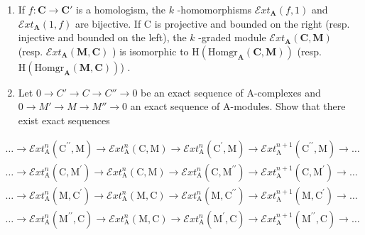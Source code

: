 \begin{enumerate}
\def\labelenumi{\alph{enumi})}
\item
  If \(f: \mathbf{C} \to \mathbf{C}'\) is a homologism, the \(k\) -homomorphisms \(\mathcal{E}xt_{\mathbf{A}}(f, 1)\) and \(\mathcal{E}xt_{\mathbf{A}}(1, f)\) are bijective. If C is projective and bounded on the right (resp. injective and bounded on the left), the \(k\) -graded module \(\mathcal{E}xt_{\mathbf{A}}(\mathbf{C}, \mathbf{M})\) (resp. \(\mathcal{E}xt_{\mathbf{A}}(\mathbf{M}, \mathbf{C})\) ) is isomorphic to \(\mathrm{H}(\mathrm{Homgr}_{\mathbf{A}}(\mathbf{C}, \mathbf{M}))\) (resp. \(\mathrm{H}(\mathrm{Homgr}_{\mathbf{A}}(\mathbf{M}, \mathbf{C}))\)) .
\item
  Let \(0 \to C' \to C \to C'' \to 0\) be an exact sequence of A-complexes and \(0 \to M' \to M \to M'' \to 0\) an exact sequence of A-modules. Show that there exist exact sequences
\end{enumerate}

\[
\begin{array}{l} \dots \to \mathcal {E} x t _ {\mathrm{A}} ^ {n} (\mathrm{C} ^ {\prime \prime}, \mathrm{M}) \to \mathcal {E} x t _ {\mathrm{A}} ^ {n} (\mathrm{C}, \mathrm{M}) \to \mathcal {E} x t _ {\mathrm{A}} ^ {n} (\mathrm{C} ^ {\prime}, \mathrm{M}) \to \mathcal {E} x t _ {\mathrm{A}} ^ {n + 1} (\mathrm{C} ^ {\prime \prime}, \mathrm{M}) \to \dots \\ \dots \to \mathcal {E} x t _ {\mathrm{A}} ^ {n} (\mathrm{C}, \mathrm{M} ^ {\prime}) \to \mathcal {E} x t _ {\mathrm{A}} ^ {n} (\mathrm{C}, \mathrm{M}) \to \mathcal {E} x t _ {\mathrm{A}} ^ {n} (\mathrm{C}, \mathrm{M} ^ {\prime \prime}) \to \mathcal {E} x t _ {\mathrm{A}} ^ {n + 1} (\mathrm{C}, \mathrm{M} ^ {\prime}) \to \dots \\ \dots \to \mathcal {E} x t _ {\mathrm{A}} ^ {n} (\mathrm{M}, \mathrm{C} ^ {\prime}) \to \mathcal {E} x t _ {\mathrm{A}} ^ {n} (\mathrm{M}, \mathrm{C}) \to \mathcal {E} x t _ {\mathrm{A}} ^ {n} (\mathrm{M}, \mathrm{C} ^ {\prime \prime}) \to \mathcal {E} x t _ {\mathrm{A}} ^ {n + 1} (\mathrm{M}, \mathrm{C} ^ {\prime}) \to \dots \\ \dots \to \mathcal {E} x t _ {\mathrm{A}} ^ {n} (\mathrm{M} ^ {\prime \prime}, \mathrm{C}) \to \mathcal {E} x t _ {\mathrm{A}} ^ {n} (\mathrm{M}, \mathrm{C}) \to \mathcal {E} x t _ {\mathrm{A}} ^ {n} (\mathrm{M} ^ {\prime}, \mathrm{C}) \to \mathcal {E} x t _ {\mathrm{A}} ^ {n + 1} (\mathrm{M} ^ {\prime \prime}, \mathrm{C}) \to \dots \end{array}
\]

